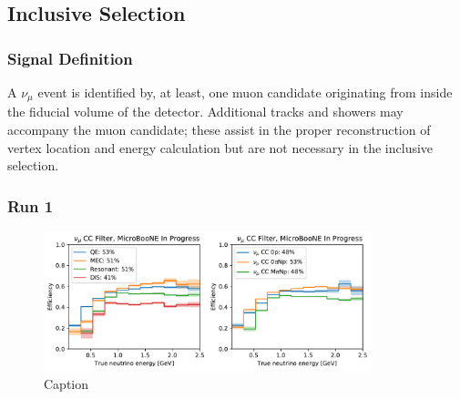 \subsection{Inclusive Selection}
\label{ssec:NuMUCCsel:INC}

\subsubsection{Signal Definition}
\label{sssec:NuMUCCsel:INC:signaldef}
\par A $\nu_{\mu}$ event is identified by, at least, one muon candidate originating from inside the fiducial volume of the detector. Additional tracks and showers may accompany the muon candidate; these assist in the proper reconstruction of vertex location and energy calculation but are not necessary in the inclusive selection. 

\subsubsection{Run 1}
\label{sssec:NuMUCCsel:INC:Run1}

\begin{figure}
    \centering
    \includegraphics[width=0.85\textwidth]{NuMuCCsel/Images/run1/numu_efficiency_run1.pdf}
    \caption{Caption}
    \label{fig:numu_eff_r1}
\end{figure}

